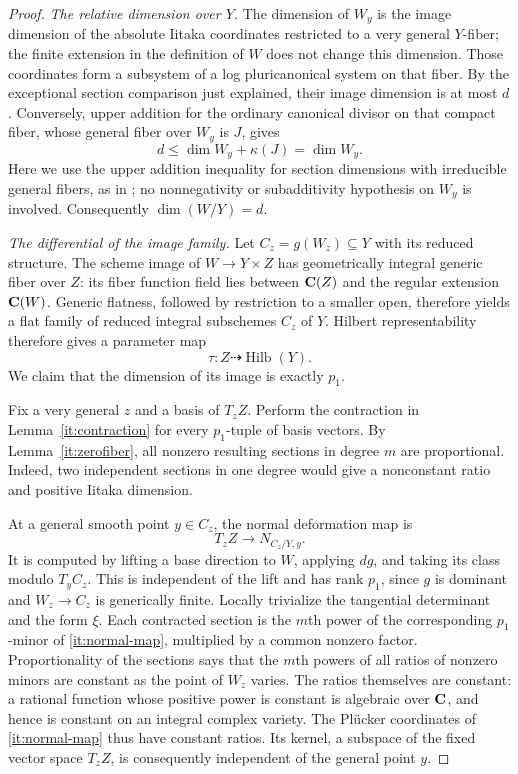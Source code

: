 \begin{proof}
\emph{The relative dimension over $Y$.}
The dimension of $W_y$ is the image dimension of the absolute Iitaka
coordinates restricted to a very general $Y$-fiber; the finite extension
in the definition of $W$ does not change this dimension.  Those
coordinates form a subsystem of a log pluricanonical system on that
fiber.  By the exceptional section comparison just explained, their
image dimension is at most $d$.  Conversely, upper addition for the
ordinary canonical divisor on that compact fiber, whose general fiber
over $W_y$ is $J$, gives
\[
 d\leq\dim W_y+\kappa(J)=\dim W_y.
\]
Here we use the upper addition inequality for section dimensions with
irreducible general fibers, as in \cite[Theorem~4, p.~357]{IitakaOriginal}; no
nonnegativity or subadditivity hypothesis on $W_y$ is involved.
Consequently $\dim(W/Y)=d$.

\emph{The differential of the image family.}
Let $C_z=g(W_z)\subseteq Y$ with its reduced structure.  The scheme
image of $W\to Y\times Z$ has geometrically integral generic fiber
over $Z$: its fiber function field lies between $\mathbf C(Z)$ and the
regular extension $\mathbf C(W)$.  Generic flatness, followed by restriction
to a smaller open, therefore yields a flat family of reduced integral
subschemes $C_z$ of $Y$. Hilbert representability
\cite[Theorems~3.1--3.2 and the discussion following Proposition~3.8]{GrothendieckHilbert}
therefore gives a parameter map
\[
 \tau:Z\dashrightarrow\operatorname{Hilb}(Y).
\]
We claim that the dimension of its image is exactly $p_1$.

Fix a very general $z$ and a basis of $T_zZ$.  Perform the contraction
in Lemma~\ref{it:contraction} for every $p_1$-tuple of basis vectors.
By Lemma~\ref{it:zerofiber}, all nonzero resulting sections in degree
$m$ are proportional.  Indeed, two independent sections in one degree
would give a nonconstant ratio and positive Iitaka dimension.

At a general smooth point $y\in C_z$, the normal deformation map is
\begin{equation}\label{it:normal-map}
 T_zZ\longrightarrow N_{C_z/Y,y}.
\end{equation}
It is computed by lifting a base direction to $W$, applying $dg$, and
taking its class modulo $T_yC_z$.  This is independent of the lift and
has rank $p_1$, since $g$ is dominant and $W_z\to C_z$ is generically
finite.  Locally trivialize the tangential determinant and the form
$\xi$.  Each contracted section is the $m$th power of the corresponding
$p_1$-minor of \eqref{it:normal-map}, multiplied by a common nonzero
factor.  Proportionality of the sections says that the $m$th powers of
all ratios of nonzero minors are constant as the point of $W_z$ varies.
The ratios themselves are constant: a rational function whose positive
power is constant is algebraic over $\mathbf C$, and hence is constant on an
integral complex variety.  The Pl\"ucker coordinates of
\eqref{it:normal-map} thus have constant ratios.  Its kernel, a subspace
of the fixed vector space $T_zZ$, is consequently independent of the
general point $y$.


\end{proof}

